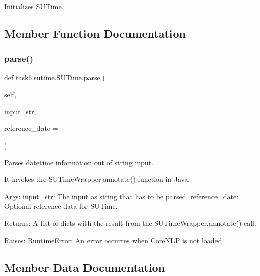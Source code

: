 \begin{DoxyVerb}Initializes SUTime.
\end{DoxyVerb}
 

\subsection{Member Function Documentation}
\mbox{\label{classtask6_1_1sutime_1_1SUTime_a171448f34de8cab7d19e1353c8495c65}} 
\subsubsection{\texorpdfstring{parse()}{parse()}}
{\footnotesize\ttfamily def task6.\+sutime.\+S\+U\+Time.\+parse (\begin{DoxyParamCaption}\item[{}]{self,  }\item[{}]{input\+\_\+str,  }\item[{}]{reference\+\_\+date = {\ttfamily \textquotesingle{}\textquotesingle{}} }\end{DoxyParamCaption})}

\begin{DoxyVerb}Parses datetime information out of string input.

It invokes the SUTimeWrapper.annotate() function in Java.

Args:
    input_str: The input as string that has to be parsed.
    reference_date: Optional reference data for SUTime.

Returns:
    A list of dicts with the result from the SUTimeWrapper.annotate()
call.

Raises:
    RuntimeError: An error occurres when CoreNLP is not loaded.
\end{DoxyVerb}
 

\subsection{Member Data Documentation}
\mbox{\label{classtask6_1_1sutime_1_1SUTime_a7e81771e26b1f92df6118f131798a034}} 
